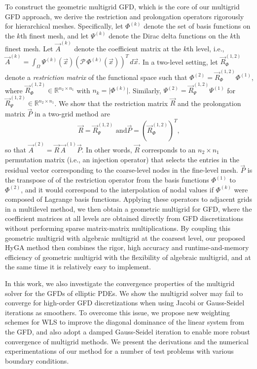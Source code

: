 \documentclass{report}
\begin{document}
To construct the geometric multigrid GFD, which is the core of our
multigrid GFD approach, we derive the restriction and prolongation
operators rigorously for hierarchical meshes. Specifically, let $\Phi^{(k)}$
denote the set of basis functions on the $k$th finest mesh, and let
$\Psi^{(k)}$ denote the Dirac delta functions on the $k$th finest
mesh. Let $\vec{A}^{(k)}$ denote the coefficient matrix at the $k$th
level, i.e.,
$\vec{A}^{(k)}=\int_{\Omega}\Psi^{(k)}(\vec{x})\left(\mathcal{P}\,\Phi^{(k)}(\vec{x})\right)^{T}\,
d\vec{x}.$
In a two-level setting, let $\vec{R}_{\Phi}^{(1,2)}$ denote a \emph{restriction
matrix} of the functional space such that $\Phi^{(2)}=\vec{R}_{\Phi}^{(1,2)}\Phi^{(1)}$,
where $\vec{R}_{\Phi}^{(1,2)}\in\mathbb{R}^{n_{2}\times n_{1}}$ with
$n_{k}=\vert\Phi^{(k)}\vert$. Similarly, $\Psi^{(2)}=\vec{R}_{\Psi}^{(1,2)}\Psi^{(1)}$
for $\vec{R}_{\Psi}^{(1,2)}\in\mathbb{R}^{n_{2}\times n_{1}}$. We
show that the restriction matrix $\vec{R}$ and the prolongation matrix
$\vec{P}$ in a two-grid method are
\begin{equation}
\vec{R}=\vec{R}_{\Psi}^{(1,2)}\mbox{ and
}\vec{P}=\left(\vec{R}_{\Phi}^{(1,2)}\right)^{T},\label{eq:restrict_prolong}
\end{equation}
so that $\vec{A}^{(2)}=\vec{R}\,\vec{A}^{(1)}\vec{P}$. In other words,
$\vec{R}$ corresponds to an $n_{2}\times n_{1}$ permutation matrix
(i.e., an injection operator) that selects the entries in the residual
vector corresponding to the coarse-level nodes in the fine-level mesh.
$\vec{P}$ is the transpose of of the restriction operator from the
basis functions $\Phi^{(1)}$ to $\Phi^{(2)}$, and it would correspond
to the interpolation of nodal values if $\Phi^{(k)}$ were composed
of Lagrange basis functions. Applying these operators to adjacent
grids in a multilevel method, we then obtain a geometric multigrid
for GFD, where the coefficient matrices at all levels are obtained
directly from GFD discretizations without performing sparse matrix-matrix
multiplications. By coupling this geometric multigrid with algebraic
multigrid at the coarsest level, our proposed HyGA method then combines
the rigor, high accuracy and runtime-and-memory efficiency of geometric
multigrid with the flexibility of algebraic multigrid, and at the
same time it is relatively easy to implement.

In this work, we also investigate the convergence properties of the
multigrid solver for the GFDs of elliptic PDEs. We show the multigrid
solver may fail to converge for high-order GFD discretizations when
using Jacobi or Gauss-Seidel iterations as smoothers. To overcome
this issue, we propose new weighting schemes for WLS to improve the
diagonal dominance of the linear system from the GFD, and also adopt
a damped Gauss-Seidel iteration to enable more robust convergence
of multigrid methods. We present the derivations and the numerical
experimentations of our method for a number of test problems with
various boundary conditions.
\end{document}
